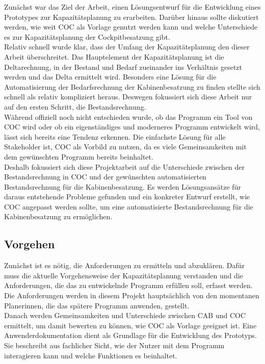 \documentclass [12pt, a4paper, oneside, titlepage, ngerman]{article}
\begin{document}
Zunächst war das Ziel der Arbeit, einen Lösungsentwurf für die Entwicklung eines Prototypes zur Kapazitätsplanung zu erarbeiten. Darüber hinaus sollte diskutiert werden, wie weit \ac{COC} als Vorlage genutzt werden kann und welche Unterschiede es zur Kapazitätsplanung der Cockpitbesatzung gibt. \\
Relativ schnell wurde klar, dass der Umfang der Kapazitätsplanung den dieser Arbeit überschreitet. Das Hauptelement der Kapazitätsplanung ist die Deltarechnung, in der Bestand und Bedarf zueinander ins Verhältnis gesetzt werden und das Delta ermittelt wird. Besonders eine Lösung für die Automatisierung der Bedarfsrechnung der Kabinenbesatzung zu finden stellte sich schnell als relativ kompliziert heraus. Deswegen fokussiert sich diese Arbeit nur auf den ersten Schritt, die Bestandsrechnung. \\
Während offiziell noch nicht entschieden wurde, ob das Programm ein Tool von \ac{COC} wird oder ob ein eigenständiges und moderneres Programm entwickelt wird, lässt sich bereits eine Tendenz erkennen. Die einfachste Lösung für alle Stakeholder ist, \ac{COC} als Vorbild zu nutzen, da es viele Gemeinsamkeiten mit dem gewünschten Programm bereits beinhaltet. \\
Deshalb fokussiert sich diese Projektarbeit auf die Unterschiede zwischen der Bestandsrechnung in \ac{COC} und der gewünschten automatisierten Bestandsrechnung für die Kabinenbesatzung. Es werden Lösungsansätze für daraus entstehende Probleme gefunden und ein konkreter Entwurf erstellt, wie \ac{COC} angepasst werden sollte, um eine automatisierte Bestandsrechnung für die Kabinenbesatzung zu ermöglichen.

\subsection {Vorgehen}
Zunächst ist es nötig, die Anforderungen zu ermitteln und abzuklären. Dafür muss die aktuelle Vorgehensweise der Kapazitätsplanung verstanden und die Anforderungen, die das zu entwickelnde Programm erfüllen soll, erfasst werden. Die Anforderungen werden in diesem Projekt hauptsächlich von den momentanen Planerinnen, die das spätere Programm anwenden, gestellt. \\
Danach werden Gemeinsamkeiten und Unterschiede zwischen \ac{CAB} und \ac{COC} ermittelt, um damit bewerten zu können, wie \ac{COC} als Vorlage geeignet ist. %
Eine Anwenderdokumentation dient als Grundlage für die Entwicklung des Prototyps. Sie beschreibt aus fachlicher Sicht, wie der Nutzer mit dem Programm interagieren kann und welche Funktionen es beinhaltet.
\end{document}
